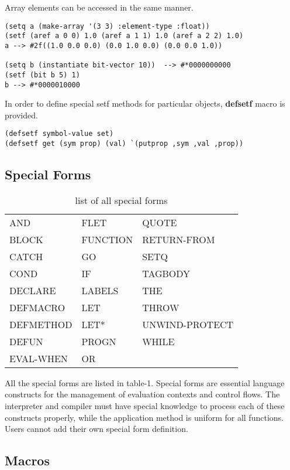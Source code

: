 Array elements can be accessed in the same manner.

\begin{verbatim}
(setq a (make-array '(3 3) :element-type :float))
(setf (aref a 0 0) 1.0 (aref a 1 1) 1.0 (aref a 2 2) 1.0)
a --> #2f((1.0 0.0 0.0) (0.0 1.0 0.0) (0.0 0.0 1.0))

(setq b (instantiate bit-vector 10))  --> #*0000000000
(setf (bit b 5) 1)
b --> #*0000010000
\end{verbatim}

In order to define special setf methods for particular objects,
{\bf defsetf} macro is provided.

\begin{verbatim}
(defsetf symbol-value set)
(defsetf get (sym prop) (val) `(putprop ,sym ,val ,prop))
\end{verbatim}

\subsection{Special Forms}

\begin{table}
\begin{tabular}{|l l l|} \hline 
AND & FLET & QUOTE \\
BLOCK & FUNCTION & RETURN-FROM\\
CATCH & GO & SETQ \\
COND & IF & TAGBODY \\
DECLARE & LABELS & THE \\
DEFMACRO & LET & THROW \\
DEFMETHOD & LET* & UNWIND-PROTECT \\
DEFUN & PROGN & WHILE \\
EVAL-WHEN & OR & \\
\hline
\end{tabular}
\caption{list of all special forms}
\end{table}

All the special forms are listed in table-1.
Special forms are essential language constructs for the management of
evaluation contexts and control flows.
The interpreter and compiler must have special knowledge to
process each of these constructs properly, while the application
method is uniform for all functions.
Users cannot add their own special form definition.

\subsection{Macros}

